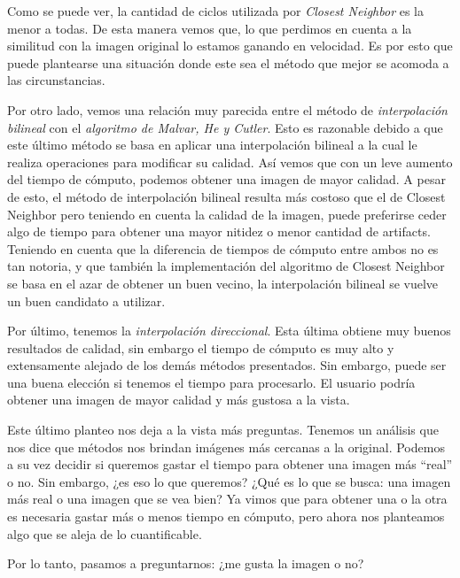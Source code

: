 \begin{itemize}
\vspace{\baselineskip}

Como se puede ver, la cantidad de ciclos utilizada por \textit{Closest Neighbor} es la menor a todas. De esta manera vemos que, lo que perdimos en cuenta a la similitud con la imagen original lo estamos ganando en velocidad. Es por esto que puede plantearse una situación donde este sea el método que mejor se acomoda a las circunstancias. 

\vspace{\baselineskip}

Por otro lado, vemos una relación muy parecida entre el método de \textit{interpolación bilineal} con el \textit{algoritmo de Malvar, He y Cutler}. Esto es razonable debido a que este último método se basa en aplicar una interpolación bilineal a la cual le realiza operaciones para modificar su calidad. Así vemos que con un leve aumento del tiempo de cómputo, podemos obtener una imagen de mayor calidad. A pesar de esto, el método de interpolación bilineal resulta más costoso que el de Closest Neighbor pero teniendo en cuenta la calidad de la imagen, puede preferirse ceder algo de tiempo para obtener una mayor nitidez o menor cantidad de artifacts. Teniendo en cuenta que la diferencia de tiempos de cómputo entre ambos no es tan notoria, y que también la implementación del algoritmo de Closest Neighbor se basa en el azar de obtener un buen vecino, la interpolación bilineal se vuelve un buen candidato a utilizar.

\vspace{\baselineskip}

Por último, tenemos la \textit{interpolación direccional}. Esta última obtiene muy buenos resultados de calidad, sin embargo el tiempo de cómputo es muy alto y extensamente alejado de los demás métodos presentados.
Sin embargo, puede ser una buena elección si tenemos el tiempo para procesarlo. El usuario podría obtener una imagen de mayor calidad y más gustosa a la vista. 

\vspace{\baselineskip}

Este último planteo nos deja a la vista más preguntas. Tenemos un análisis que nos dice que métodos nos brindan imágenes más cercanas a la original. Podemos a su vez decidir si queremos gastar el tiempo para obtener una imagen más ``real'' o no. Sin embargo, ¿es eso lo que queremos? ¿Qué es lo que se busca: una imagen más real o una imagen que se vea bien? Ya vimos que para obtener una o la otra es necesaria gastar más o menos tiempo en cómputo, pero ahora nos planteamos algo que se aleja de lo cuantificable. 

\vspace{\baselineskip}

Por lo tanto, pasamos a preguntarnos: ¿me gusta la imagen o no?

\end{itemize}

